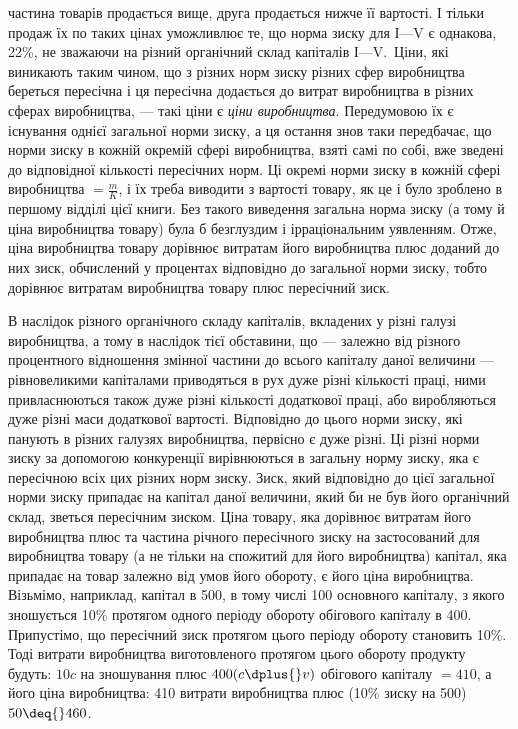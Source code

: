 частина товарів продається вище, друга продається нижче її
вартості. І тільки продаж їх по таких цінах уможливлює те, що
норма зиску для І—V є однакова, 22\%, не зважаючи на різний
органічний склад капіталів І—V.~Ціни, які виникають таким чином, що з різних норм зиску різних сфер
виробництва береться
пересічна і ця пересічна додається до витрат виробництва в різних сферах виробництва, — такі ціни є
\emph{ціни виробництва}. Передумовою їх є існування однієї загальної норми зиску, а ця
остання знов таки передбачає, що норми зиску в кожній окремій сфері виробництва, взяті самі по собі,
вже зведені до
відповідної кількості пересічних норм. Ці окремі норми зиску в кожній сфері виробництва $= \frac{m}{K}$, і їх
треба виводити з вартості товару, як це і було зроблено в першому відділі цієї книги. Без такого
виведення загальна норма зиску (а тому й ціна виробництва товару) була б безглуздим і ірраціональним
уявленням. Отже, ціна виробництва товару дорівнює витратам його
виробництва плюс доданий до них зиск, обчислений у процентах
відповідно до загальної норми зиску, тобто дорівнює витратам
виробництва товару плюс пересічний зиск.

В наслідок різного органічного складу капіталів, вкладених
у різні галузі виробництва, а тому в наслідок тієї обставини,
що — залежно від різного процентного відношення змінної частини до всього капіталу даної величини —
рівновеликими капіталами приводяться в рух дуже різні кількості праці, ними привласнюються також
дуже різні кількості додаткової праці, або
виробляються дуже різні маси додаткової вартості. Відповідно
до цього норми зиску, які панують в різних галузях виробництва,
первісно є дуже різні. Ці різні норми зиску за допомогою конкуренції вирівнюються в загальну
норму зиску, яка
є пересічною всіх цих різних норм зиску. Зиск, який відповідно
до цієї загальної норми зиску припадає на капітал даної величини, який би не був його органічний
склад, зветься пересічним
зиском. Ціна товару, яка дорівнює витратам його виробництва
плюс та частина річного пересічного зиску на застосований для
виробництва товару (а не тільки на спожитий для його виробництва) капітал, яка припадає на товар
залежно від умов його
обороту, є його ціна виробництва. Візьмімо, наприклад, капітал
в 500, в тому числі 100 основного капіталу, з якого зношується
10\% протягом одного періоду обороту обігового капіталу в 400.
Припустімо, що пересічний зиск протягом цього періоду обороту становить 10\%. Тоді витрати
виробництва виготовленого
протягом цього обороту продукту будуть: $10 c$ на зношування
плюс $400 (c \dplus{} v)$ обігового капіталу $= 410$, а його ціна виробництва: 410 витрати виробництва плюс
(10\% зиску на 500) $50 \deq{} 460$.

